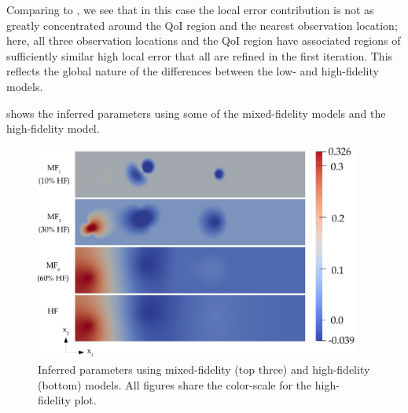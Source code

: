 \documentclass[review,sort&compress]{elsarticle}
\begin{document}
%
Comparing to , we see that in this case the local error contribution is not as greatly concentrated around the QoI region and the nearest observation location; here, all three observation locations and the QoI region have associated regions of sufficiently similar high local error that all are refined in the first iteration. This reflects the global nature of the differences between the low- and high-fidelity models. 

 shows the inferred parameters using some of the mixed-fidelity models and the high-fidelity model.
%
\begin{figure}[htbp]
\centering
\includegraphics[width=0.95\textwidth]{svf/svf_param_fused.pdf}
\caption{Inferred parameters using mixed-fidelity (top three) and high-fidelity (bottom) models. All figures share the color-scale for the high-fidelity plot.}
\label{fig:svfRefParams}
\end{figure}
\end{document}
